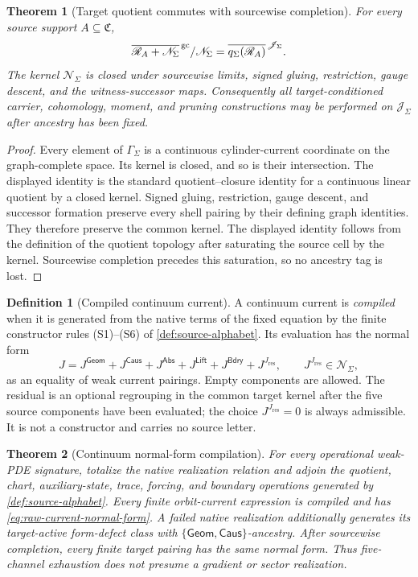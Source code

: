 \documentclass[11pt]{article}
\numberwithin{section}{part}
\theoremstyle{plain}
\newtheorem{theorem}{Theorem}[section]
\theoremstyle{definition}
\newtheorem{definition}[definition]{Definition}
\theoremstyle{remark}
\newcommand{\Geom}{\mathsf{Geom}}
\newcommand{\Caus}{\mathsf{Caus}}
\newcommand{\Abs}{\mathsf{Abs}}
\newcommand{\Lift}{\mathsf{Lift}}
\newcommand{\Bdry}{\mathsf{Bdry}}
\newcommand{\Res}{J_{\mathrm{res}}}
\newcommand{\Channels}{\mathfrak C}
\newcommand{\Null}{\mathscr N}
\newcommand{\Records}{\mathscr R}
\begin{document}
\begin{theorem}[Target quotient commutes with sourcewise completion]
\label{thm:target-quotient-completion}
For every source support \(A\subseteq\Channels\),
\[
 \overline{\Records_A+\Null_\Sigma}^{\,\rm gc}/\Null_\Sigma
 =
 \overline{q_\Sigma(\Records_A)}^{\,\mathscr J_\Sigma}.
\]
The kernel \(\Null_\Sigma\) is closed under sourcewise limits, signed gluing,
restriction, gauge descent, and the witness-successor maps.  Consequently all
target-conditioned carrier, cohomology, moment, and pruning constructions may
be performed on \(\mathscr J_\Sigma\) after ancestry has been fixed.
\end{theorem}

\begin{proof}
Every element of \(\Gamma_\Sigma\) is a continuous cylinder-current
coordinate on the graph-complete space.  Its kernel is closed, and so is their
intersection.  The displayed identity is the standard quotient--closure
identity for a continuous linear quotient by a closed kernel.  Signed gluing,
restriction, gauge descent, and successor formation preserve every shell
pairing by their defining graph identities.  They therefore preserve the
common kernel.  The displayed identity follows from the definition of the
quotient topology after saturating the source cell by the kernel.  Sourcewise
completion precedes this saturation, so no ancestry tag is lost.
\end{proof}

\begin{definition}[Compiled continuum current]
\label{def:closed-current-normal-form}
A continuum current is \emph{compiled} when it is generated from the native
terms of the fixed equation by the finite constructor rules
\textup{(S1)}--\textup{(S6)} of \cref{def:source-alphabet}.  Its evaluation
has the normal form
\begin{equation}
 \label{eq:raw-current-normal-form}
 J=J^{\Geom}+J^{\Caus}+J^{\Abs}+J^{\Lift}+J^{\Bdry}+J^{\Res},
 \qquad J^{\Res}\in\Null_\Sigma,
\end{equation}
as an equality of weak current pairings.  Empty components are allowed.
The residual is an optional regrouping in the common target kernel after the
five source components have been evaluated; the choice \(J^{\Res}=0\) is
always admissible.  It is not a constructor and carries no source letter.
\end{definition}

\begin{theorem}[Continuum normal-form compilation]
\label{thm:continuum-normal-form-compilation}
For every operational weak-PDE signature, totalize the native realization
relation and adjoin the quotient, chart, auxiliary-state, trace, forcing, and
boundary operations generated by \cref{def:source-alphabet}.  Every finite
orbit-current expression is compiled and has
\eqref{eq:raw-current-normal-form}.  A failed native realization additionally
generates its target-active form-defect class with
\(\{\Geom,\Caus\}\)-ancestry.  After sourcewise completion, every finite
target pairing has the same normal form.  Thus five-channel exhaustion does
not presume a gradient or sector realization.
\end{theorem}
\end{document}
